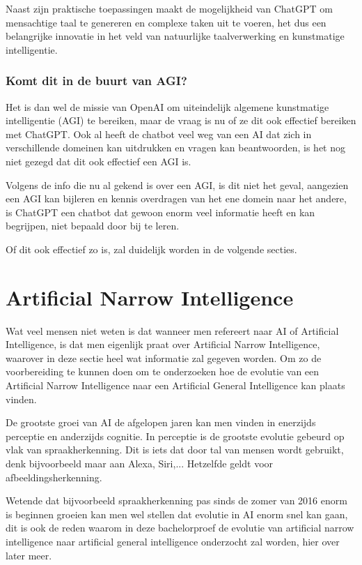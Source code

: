 Naast zijn praktische toepassingen maakt de mogelijkheid van ChatGPT om mensachtige taal te genereren en complexe taken uit te voeren, het dus een belangrijke innovatie in het veld van natuurlijke taalverwerking en kunstmatige intelligentie.

\cite{lund2023chatting}

\subsubsection{Komt dit in de buurt van AGI?}

Het is dan wel de missie van OpenAI om uiteindelijk algemene kunstmatige intelligentie (AGI) te bereiken, maar de vraag is nu of ze dit ook effectief bereiken met ChatGPT.
Ook al heeft de chatbot veel weg van een AI dat zich in verschillende domeinen kan uitdrukken en vragen kan beantwoorden, is het nog niet gezegd dat dit ook effectief een AGI is.

Volgens de info die nu al gekend is over een AGI, is dit niet het geval, aangezien een AGI kan bijleren en kennis overdragen van het ene domein naar het andere, is ChatGPT een chatbot dat gewoon enorm veel informatie heeft en kan begrijpen, niet bepaald door bij te leren. 

Of dit ook effectief zo is, zal duidelijk worden in de volgende secties.

\section{Artificial Narrow Intelligence}

Wat veel mensen niet weten is dat wanneer men refereert naar AI of Artificial Intelligence, is dat men eigenlijk praat over Artificial Narrow Intelligence, waarover in deze sectie heel wat informatie zal gegeven worden. Om zo de voorbereiding te kunnen doen om te onderzoeken hoe de evolutie van een Artificial Narrow Intelligence naar een Artificial General Intelligence kan plaats vinden.

De grootste groei van AI de afgelopen jaren kan men vinden in enerzijds perceptie en anderzijds cognitie. In perceptie is de grootste evolutie gebeurd op vlak van spraakherkenning. Dit is iets dat door tal van mensen wordt gebruikt, denk bijvoorbeeld maar aan Alexa, Siri,... Hetzelfde geldt voor afbeeldingsherkenning.

Wetende dat bijvoorbeeld spraakherkenning pas sinds de zomer van 2016 enorm is beginnen groeien kan men wel stellen dat evolutie in AI enorm snel kan gaan, dit is ook de reden waarom in deze bachelorproef de evolutie van artificial narrow intelligence naar artificial general intelligence onderzocht zal worden, hier over later meer. \autocite{brynjolfsson2017artificial}

